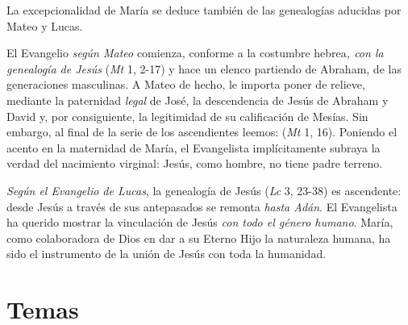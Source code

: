\begin{body}
					La excepcionalidad de María se deduce también de las genealogías aducidas por Mateo y Lucas.
					
					El Evangelio \emph{según Mateo} comienza, conforme a la costumbre hebrea\emph{, con la genealogía de Jesús} (\emph{Mt} 1, 2-17) y hace un elenco partiendo de Abraham, de las generaciones masculinas. A Mateo de hecho, le importa poner de relieve, mediante la paternidad \emph{legal} de José, la descendencia de Jesús de Abraham y David y, por consiguiente, la legitimidad de su calificación de Mesías. Sin embargo, al final de la serie de los ascendientes leemos:  (\emph{Mt} 1, 16). Poniendo el acento en la maternidad de María, el Evangelista implícitamente subraya la verdad del nacimiento virginal: Jesús, como hombre, no tiene padre terreno.
					
					\emph{Según el Evangelio de Lucas}, la genealogía de Jesús (\emph{Lc} 3, 23-38) es ascendente: desde Jesús a través de sus antepasados se remonta \emph{hasta Adán}. El Evangelista ha querido mostrar la vinculación de Jesús \emph{con todo el género humano}. María, como colaboradora de Dios en dar a su Eterno Hijo la naturaleza humana, ha sido el instrumento de la unión de Jesús con toda la humanidad.
				\end{body}

\newsection

	\section{Temas}

